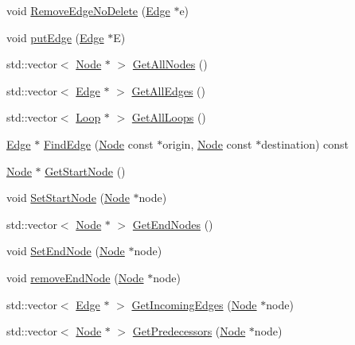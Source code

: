 \begin{DoxyCompactItemize}
\item 
void \hyperlink{classcfglib_1_1Cfg_acebbb5cb49f9cf8c50ffe0918cbd98d1}{Remove\+Edge\+No\+Delete} (\hyperlink{classcfglib_1_1Edge}{Edge} $\ast$e)
\item 
void \hyperlink{classcfglib_1_1Cfg_aca4049e467e6979666c3273bf3e3045a}{put\+Edge} (\hyperlink{classcfglib_1_1Edge}{Edge} $\ast$E)
\item 
std\+::vector$<$ \hyperlink{classcfglib_1_1Node}{Node} $\ast$ $>$ \hyperlink{classcfglib_1_1Cfg_a0a5b78a124083bb3419d10968de0554a}{Get\+All\+Nodes} ()
\item 
std\+::vector$<$ \hyperlink{classcfglib_1_1Edge}{Edge} $\ast$ $>$ \hyperlink{classcfglib_1_1Cfg_aae35959d564c688ffe76f3d121c47447}{Get\+All\+Edges} ()
\item 
std\+::vector$<$ \hyperlink{classcfglib_1_1Loop}{Loop} $\ast$ $>$ \hyperlink{classcfglib_1_1Cfg_ac5e6efa01325b49924190a1f89727ed5}{Get\+All\+Loops} ()
\item 
\hyperlink{classcfglib_1_1Edge}{Edge} $\ast$ \hyperlink{classcfglib_1_1Cfg_a89f9917fc598d5782698823d2d006782}{Find\+Edge} (\hyperlink{classcfglib_1_1Node}{Node} const $\ast$origin, \hyperlink{classcfglib_1_1Node}{Node} const $\ast$destination) const
\item 
\hyperlink{classcfglib_1_1Node}{Node} $\ast$ \hyperlink{classcfglib_1_1Cfg_ae3c864797fe19d85c1ab303baa7e9fbb}{Get\+Start\+Node} ()
\item 
void \hyperlink{classcfglib_1_1Cfg_ad77f85cebfb1ef7e55afa78f48b6f96e}{Set\+Start\+Node} (\hyperlink{classcfglib_1_1Node}{Node} $\ast$node)
\item 
std\+::vector$<$ \hyperlink{classcfglib_1_1Node}{Node} $\ast$ $>$ \hyperlink{classcfglib_1_1Cfg_aa94cd8bb8d1d33cdcd6d1a7e0b244370}{Get\+End\+Nodes} ()
\item 
void \hyperlink{classcfglib_1_1Cfg_ae235a54ff74dd424c6b5d582ce670c5b}{Set\+End\+Node} (\hyperlink{classcfglib_1_1Node}{Node} $\ast$node)
\item 
void \hyperlink{classcfglib_1_1Cfg_a892063ed55599c1618e49dd31555e7fb}{remove\+End\+Node} (\hyperlink{classcfglib_1_1Node}{Node} $\ast$node)
\item 
std\+::vector$<$ \hyperlink{classcfglib_1_1Edge}{Edge} $\ast$ $>$ \hyperlink{classcfglib_1_1Cfg_ac87776adfdc86881d01c4ea529004c1a}{Get\+Incoming\+Edges} (\hyperlink{classcfglib_1_1Node}{Node} $\ast$node)
\item 
std\+::vector$<$ \hyperlink{classcfglib_1_1Node}{Node} $\ast$ $>$ \hyperlink{classcfglib_1_1Cfg_ac5fcaa98be7d92862fa1cfa12bc539e6}{Get\+Predecessors} (\hyperlink{classcfglib_1_1Node}{Node} $\ast$node)

\end{DoxyCompactItemize}
